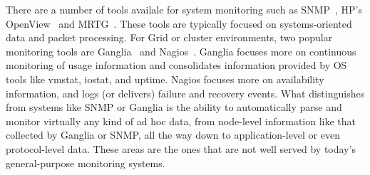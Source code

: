 There are a number of tools availale for system monitoring such
as SNMP~\cite{snmprfc1157}, HP's OpenView~\cite{openview}
and MRTG~\cite{mrtg}. These tools are typically focused on systems-oriented
data and packet processing.  
For Grid or cluster environments, two popular monitoring tools are
Ganglia~\cite{ganglia} and Nagios~\cite{nagios}.  Ganglia focuses more
on continuous monitoring of usage information and consolidates
information provided by OS tools like vmstat, iostat, and uptime.
Nagios focuses more on availability information, and logs (or
delivers) failure and recovery events. 
What distinguishes \padsd{} from systems like SNMP or Ganglia is the
ability to automatically parse and monitor virtually any kind of
ad hoc data, from node-level information like that collected by
Ganglia or SNMP, all the way down to application-level or even
protocol-level data. These areas are the ones that are not well served
by today's general-purpose monitoring systems. 





